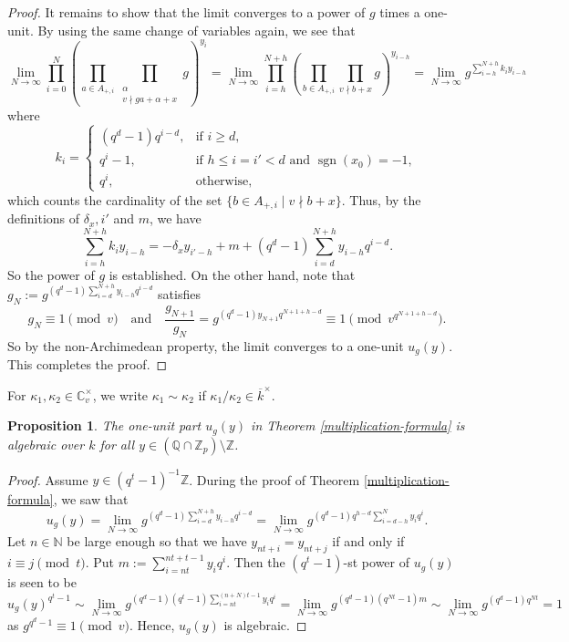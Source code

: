 \documentclass[11pt]{amsart}
\theoremstyle{plain}
\newtheorem{prop}[thm]{Proposition}
\theoremstyle{definition}
\theoremstyle{remark}
\numberwithin{equation}{section}
\newcommand{\ZZ}{\mathbb{Z}}
\newcommand{\NN}{\mathbb{N}}
\newcommand{\QQ}{\mathbb{Q}}
\newcommand{\CC}{\mathbb{C}}
\newcommand{\sgn}{\operatorname{sgn}}
\newcommand{\ovl}{\overline}
\newcommand{\Ami}{A_{+,i}}
\begin{document}
\begin{proof}
		It remains to show that the limit converges to a power of $g$ times a one-unit.
		By using the same change of variables again, we see that
		$$
		\lim_{N\to\infty} \prod_{i=0}^N \left( \prod_{a\in\Ami} \prod_{\substack{\alpha \\ v\nmid ga+\alpha+x}} g \right)^{y_i}
		= \lim_{N\to\infty} \prod_{i=h}^{N+h} \left( \prod_{b\in\Ami} \prod_{ v \nmid b+x} g \right)^{y_{i-h}}
		= \lim_{N\to\infty} g^{\sum_{i=h}^{N+h} k_iy_{i-h}}
		$$
		where
		$$
		k_i =
		\begin{cases}
			(q^d-1)q^{i-d}, & \text{if } i \geq d,  \\
			q^i-1, & \text{if } h \leq i = i' < d  \text{ and } \sgn(x_0)=-1, \\
			q^i, & \text{otherwise},
		\end{cases}
		$$
		which counts the cardinality of the set $\{b \in\Ami \mid v \nmid b+x\}$.
		Thus, by the definitions of $\delta_x,i'$ and $m$, we have
		$$
		\sum_{i=h}^{N+h} k_iy_{i-h}
		= -\delta_x y_{i'-h} + m + (q^d-1)\sum_{i=d}^{N+h} y_{i-h} q^{i-d}.
		$$
		So the power of $g$ is established.
		On the other hand, note that $g_N := g^{(q^d-1)\sum_{i=d}^{N+h} y_{i-h} q^{i-d}}$ satisfies
		$$
		g_N \equiv 1 \pmod{v}
		\quad
		\text{and}
		\quad
		\frac{g_{N+1}}{g_N} = g^{(q^d-1)y_{N+1}q^{N+1+h-d}} \equiv 1 \pmod{v^{q^{N+1+h-d}}}.
		$$ 
		So by the non-Archimedean property, the limit converges to a one-unit $u_g(y)$.
		This completes the proof.
	\end{proof}
	
	For $\kappa_1,\kappa_2 \in \CC_v^\times$, we write $\kappa_1 \sim \kappa_2$ if $\kappa_1/\kappa_2 \in \ovl{k}^\times$.
	
	\begin{prop}
		The one-unit part $u_g(y)$ in Theorem \ref{multiplication-formula} is algebraic over $k$ for all $y \in (\QQ \cap \ZZ_p) \setminus \ZZ$.
	\end{prop}
	
	\begin{proof}
		Assume $y \in (q^t-1)^{-1}\ZZ$.
		During the proof of Theorem \ref{multiplication-formula}, we saw that
		$$
		u_g(y)
		= \lim_{N\to\infty} g^{ (q^d-1)\sum_{i=d}^{N+h} y_{i-h} q^{i-d} }
		= \lim_{N\to\infty} g^{ (q^d-1)q^{h-d} \sum_{i=d-h}^{N} y_i q^i }.
		$$
		Let $n \in \NN$ be large enough so that we have $y_{nt+i} = y_{nt+j}$ if and only if $i \equiv j \pmod{t}$.
		Put $m := \sum_{i=nt}^{nt+t-1} y_iq^i$.
		Then the $(q^t-1)$-st power of $u_g(y)$ is seen to be
		$$
		u_g(y)^{q^t-1}
		\sim \lim_{N\to\infty} g^{ (q^d-1) (q^t-1) \sum_{i=nt}^{(n+N)t-1} y_i q^i }
		= \lim_{N\to\infty} g^{ (q^d-1)(q^{Nt}-1)m}
		\sim \lim_{N\to\infty} g^{ (q^d-1)q^{Nt}}
		= 1
		$$
		as $g^{q^d-1} \equiv 1 \pmod{v}$.
		Hence, $u_g(y)$ is algebraic.
	\end{proof}
	
\end{document}
